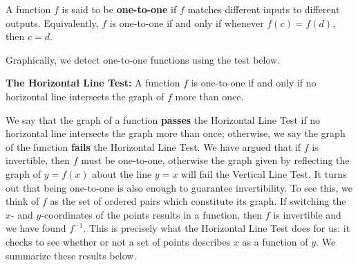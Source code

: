 \smallskip

\colorbox{ResultColor}{\bbm

\begin{defn} \label{onetoone} A function $f$ is said to be  \textbf{one-to-one} if $f$ matches different inputs to different outputs.  Equivalently, $f$ is one-to-one if and only if  whenever $f(c) = f(d)$, then $c=d$. 

\end{defn}
\ebm}

\smallskip

Graphically, we detect one-to-one functions using the test below.

\smallskip

\colorbox{ResultColor}{\bbm

\begin{thm}  \textbf{The Horizontal Line Test:} A function $f$ is one-to-one if and only if no horizontal line intersects the graph of $f$ more than once.

\label{HLT}

\end{thm}

\ebm}

\smallskip

We say that the graph of a function \textbf{passes} the Horizontal Line Test  if no horizontal line intersects the graph more than once; otherwise, we say the graph of the function \textbf{fails} the Horizontal Line Test.  We have argued that if $f$ is invertible, then $f$ must be one-to-one, otherwise the graph given by reflecting the graph of $y = f(x)$ about the line $y = x$ will fail the Vertical Line Test. It turns out that being one-to-one is also enough to guarantee invertibility.  To see this, we think of $f$ as the set of ordered pairs which constitute its graph.  If switching the $x$- and $y$-coordinates of the points results in a function, then $f$ is invertible and we have found $f^{-1}$. This is precisely what the Horizontal Line Test does for us:  it checks to see whether or not a set of points describes $x$ as a function of $y$.  We summarize these results below.
  
\smallskip

